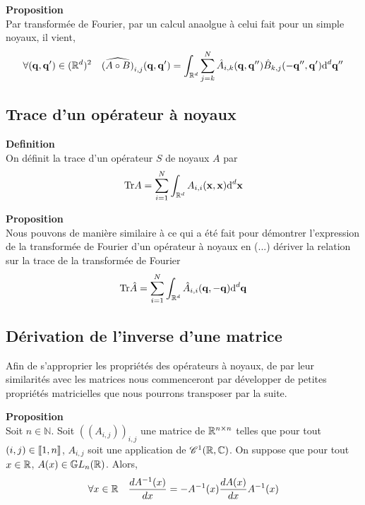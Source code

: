 \documentclass[10pt]{article}
\begin{document}
\textbf{Proposition}\\
Par transformée de Fourier, par un calcul anaolgue à celui fait pour un simple noyaux, il vient,
\begin{equation}
\forall ({\bf q}, {\bf q}') \in (\mathbb{R}^d)^2 \quad\widehat{(A \circ B)}_{i,j}({\bf q}, {\bf q}') =\int_{\mathbb{R}^d} \sum_{j=k}^{N}\hat{A}_{i,k}({\bf q}, {\bf q}'')\hat{B}_{k,j}(-{\bf q}'', {\bf q}')  \text{d}^d {\bf q}'' 
\end{equation}



\vspace*{11pt}

\subsection{Trace d'un opérateur à noyaux}

\textbf{Definition}\\
On définit la trace d'un opérateur $S$ de noyaux $A$ par
\begin{equation}
  \text{Tr} A = \sum_{i=1}^{N} \int_{\mathbb{R}^d} A_{i,i}({\bf x},{\bf x}) \text{d}^d {\bf x} 
\end{equation}


\textbf{Proposition}\\
Nous pouvons de manière similaire à ce qui a été fait pour démontrer l'expression de la transformée de Fourier d'un opérateur à noyaux en (...) dériver la relation sur la trace de la transformée de Fourier
\begin{equation}
  \text{Tr} \hat{A} = \sum_{i=1}^{N} \int_{\mathbb{R}^d} \hat{A}_{i,i}({\bf q},-{\bf q}) \text{d}^d {\bf q} 
\end{equation}



\vspace*{11pt}



\subsection{Dérivation de l'inverse d'une matrice}

Afin de s'approprier les propriétés des opérateurs à noyaux, de par leur similarités avec les matrices nous commenceront par développer de petites propriétés matricielles que nous pourrons transposer par la suite.

\vspace*{11pt}

\textbf{Proposition} \\
Soit $ n \in \mathbb{N}$. Soit $((A_{i,j}))_{i,j}$ une matrice de $\mathbb{R}^{n \times n}$ telles que pour tout $(i,j) \in  \llbracket 1,n \rrbracket $, $A_{i,j}$ soit une application de $\mathscr{C}^1(\mathbb{R},\mathbb{C}) $. On suppose que pour tout $x \in \mathbb{R}$, $A(x) \in  \mathbb{G}L_n(\mathbb{R})$. Alors, 
\begin{equation}
  \forall x \in \mathbb{R} \quad \frac{dA^{-1}(x)}{dx} = - A^{-1}(x) \frac{dA(x)}{dx}A^{-1}(x)
\end{equation} 
\end{document}
